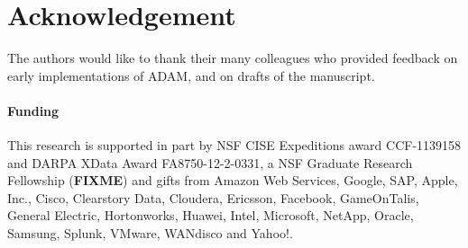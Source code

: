 \documentclass{bioinfo}
\begin{document}
\section*{Acknowledgement}
\label{sec:acknowledgement}

The authors would like to thank their many colleagues who provided feedback on early implementations of ADAM, and on drafts of the
manuscript.

\paragraph{Funding\textcolon}
\label{sec:funding}

This research is supported in part by NSF CISE Expeditions award CCF-1139158 and DARPA XData Award FA8750-12-2-0331, a NSF
Graduate Research Fellowship (\textbf{FIXME}) and gifts from Amazon Web Services, Google, SAP,  Apple, Inc., Cisco, Clearstory Data,
Cloudera, Ericsson, Facebook, GameOnTalis, General Electric, Hortonworks, Huawei, Intel, Microsoft, NetApp, Oracle, Samsung, Splunk,
VMware, WANdisco and Yahoo!.




\end{document}
